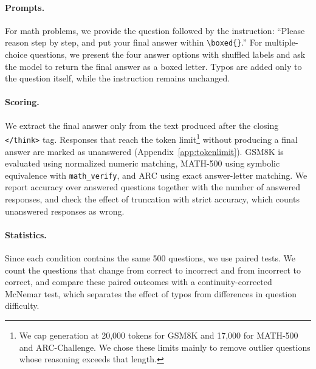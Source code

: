 \documentclass[11pt]{article}
\begin{document}
\paragraph{Prompts.} For math problems, we provide the question followed by the instruction: ``Please reason step by step, and put your final answer within \texttt{\textbackslash{}boxed\{\}}.'' For multiple-choice questions, we present the four answer options with shuffled labels and ask the model to return the final answer as a boxed letter. Typos are added only to the question itself, while the instruction remains unchanged.

\paragraph{Scoring.} We extract the final answer only from the text produced after the closing \texttt{\textless{}/think\textgreater{}} tag. Responses that reach the token limit\footnote{We cap generation at 20,000 tokens for GSM8K and 17,000 for MATH-500 and ARC-Challenge. We chose these limits mainly to remove outlier questions whose reasoning exceeds that length.} without producing a final answer are marked as unanswered (Appendix~\ref{app:tokenlimit}). GSM8K is evaluated using normalized numeric matching, MATH-500 using symbolic equivalence with \texttt{math\_verify}, and ARC using exact answer-letter matching. We report accuracy over answered questions together with the number of answered responses, and check the effect of truncation with strict accuracy, which counts unanswered responses as wrong.

\paragraph{Statistics.} Since each condition contains the same 500 questions, we use paired tests. We count the questions that change from correct to incorrect and from incorrect to correct, and compare these paired outcomes with a continuity-corrected McNemar test, which separates the effect of typos from differences in question difficulty.
\end{document}
